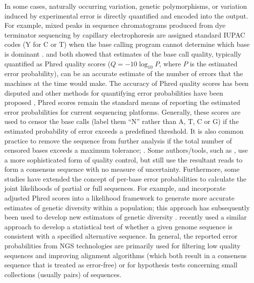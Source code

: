 \documentclass[10pt]{article}
\begin{document}
In some cases, naturally occurring variation, \ie genetic polymorphisms, or variation induced by experimental error is directly quantified and encoded into the output.
For example, mixed peaks in sequence chromatograms produced from dye terminator sequencing by capillary electrophoresis are assigned standard IUPAC codes (\eg Y for C or T) when the base calling program cannot determine which base is dominant \citep{NomenclatureIncompletelySpecified1986}.
\citet{ewingBaseCallingAutomatedSequencer1998} and \citet{richterichEstimationErrorsRaw1998} both showed that estimates of the base call quality, typically quantified as Phred quality scores ($Q=-10 \log_{10} P$, where $P$ is the estimated error probability), can be an accurate estimate of the number of errors that the machines at the time would make.
The accuracy of Phred quality scores has been disputed and other methods for quantifying error probabilities have been proposed \citep{liAdjustQualityScores2004, depristoFrameworkVariationDiscovery2011, liSNPDetectionMassively2009}, Phred scores remain the standard means of reporting the estimated error probabilities for current sequencing platforms.
Generally, these scores are used to censor the base calls (\ie label them ``N'' rather than A, T, C or G) if the estimated probability of error exceeds a predefined threshold.
It is also common practice to remove the sequence from further analysis if the total number of censored bases exceeds a maximum tolerance; \eg \citet{doroninaPhylogeneticPositionEmended2005, robaskyRoleReplicatesError2014,oraweAccountingUncertaintyDNA2015}.
Some authors/tools, such as \citet{lippiPotentialPreanalyticalAnalytical2020}, use a more sophisticated form of quality control, but still use the resultant reads to form a consensus sequence with no measure of uncertainty.
Furthermore, some studies have extended the concept of per-base error probabilities to calculate the joint likelihoods of partial or full sequences.
For example, \citet{depristoFrameworkVariationDiscovery2011} and \citet{gompertHierarchicalBayesianModel2011} incorporate adjusted Phred scores into a likelihood framework to generate more accurate estimates of genetic diversity within a population; this approach has subsequently been used to develop new estimators of genetic diversity \citep{fumagalliQuantifyingPopulationGenetic2013a}. 
\citet{kuoEAGLEExplicitAlternative2018} recently used a similar approach to develop a statistical test of whether a given genome sequence is consistent with a specified alternative sequence.
In general, the reported error probabilities from NGS technologies are primarily used for filtering low quality sequences and improving alignment algorithms (which both result in a consensus sequence that is treated as error-free) or for hypothesis tests concerning small collections (usually pairs) of sequences.
\end{document}

